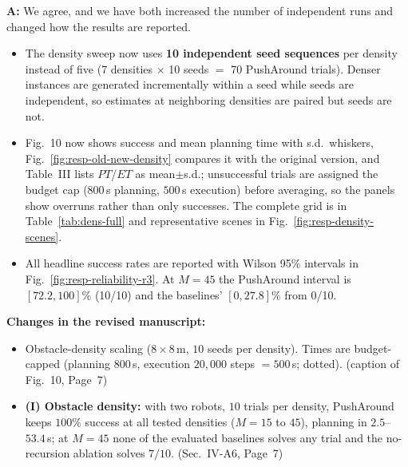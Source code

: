 \documentclass[11pt]{article}
\newcommand{\change}[1]{{\color{blue}#1}}
\begin{document}
\noindent \textbf{A:}
We agree, and we have both increased the number of independent runs and changed
how the results are reported.

\begin{itemize}
\item The density sweep now uses \textbf{10 independent seed
sequences} per density instead of five (7 densities $\times$ 10 seeds $=$ 70
PushAround trials). Denser instances are generated incrementally
within a seed while seeds are independent, so estimates at neighboring densities are paired but
seeds are not.
\item Fig.~10 now shows success and mean planning time with s.d.\ whiskers, Fig.~\ref{fig:resp-old-new-density}
compares it with the original version, and Table~III lists $PT$/$ET$ as mean$\pm$s.d.; unsuccessful
trials are assigned the budget cap ($800$\,s planning, $500$\,s execution) before averaging, so the
panels show overruns rather than only successes. The complete grid is in
Table~\ref{tab:dens-full} and representative scenes in Fig.~\ref{fig:resp-density-scenes}.
\item All headline success rates are reported with Wilson
95\% intervals in Fig.~\ref{fig:resp-reliability-r3}. At $M{=}45$ the PushAround interval is $[72.2,100]\%$ (10/10) and the baselines' $[0,27.8]\%$ from 0/10.
\end{itemize}

\noindent\textbf{Changes in the revised manuscript:}

\begin{itemize}
\item \change{Obstacle-density scaling ($8\times 8$\,m, $10$ seeds per density). Times are budget-capped (planning $800$\,s, execution $20{,}000$ steps $=500$\,s; dotted).} (caption of Fig.~10, Page~7)
\item \change{\textbf{(I) Obstacle density:} with two robots, $10$ trials per density, PushAround keeps $100\%$ success at all tested densities ($M{=}15$ to $45$), planning in $2.5$--$53.4$\,s; at $M{=}45$ none of the evaluated baselines solves any trial and the no-recursion ablation solves $7/10$.} (Sec.~IV-A6, Page~7)
\end{itemize}
\end{document}
